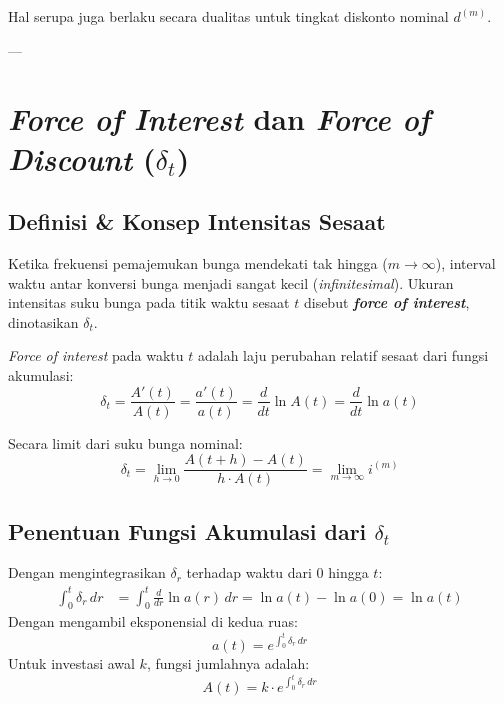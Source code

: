 \documentclass[11pt,a4paper]{article}
\begin{document}
Hal serupa juga berlaku secara dualitas untuk tingkat diskonto nominal $d^{(m)}$.

---

\section{\textit{Force of Interest} dan \textit{Force of Discount} ($\delta_t$)}

\subsection{Definisi \& Konsep Intensitas Sesaat}
Ketika frekuensi pemajemukan bunga mendekati tak hingga ($m \to \infty$), interval waktu antar konversi bunga menjadi sangat kecil (\textit{infinitesimal}). Ukuran intensitas suku bunga pada titik waktu sesaat $t$ disebut \textbf{\textit{force of interest}}, dinotasikan $\delta_t$.

\begin{definitionbox}
\textit{Force of interest} pada waktu $t$ adalah laju perubahan relatif sesaat dari fungsi akumulasi:
\begin{equation}
    \delta_t = \frac{A'(t)}{A(t)} = \frac{a'(t)}{a(t)} = \frac{d}{dt} \ln A(t) = \frac{d}{dt} \ln a(t)
\end{equation}
\end{definitionbox}

Secara limit dari suku bunga nominal:
\begin{equation}
    \delta_t = \lim_{h \to 0} \frac{A(t+h) - A(t)}{h \cdot A(t)} = \lim_{m \to \infty} i^{(m)}
\end{equation}

\subsection{Penentuan Fungsi Akumulasi dari $\delta_t$}
Dengan mengintegrasikan $\delta_r$ terhadap waktu dari $0$ hingga $t$:
\begin{align}
    \int_0^t \delta_r \, dr &= \int_0^t \frac{d}{dr} \ln a(r) \, dr = \ln a(t) - \ln a(0) = \ln a(t)
\end{align}
Dengan mengambil eksponensial di kedua ruas:
\begin{equation}
    a(t) = e^{\int_0^t \delta_r \, dr}
\end{equation}
Untuk investasi awal $k$, fungsi jumlahnya adalah:
\begin{equation}
    A(t) = k \cdot e^{\int_0^t \delta_r \, dr}
\end{equation}
\end{document}

